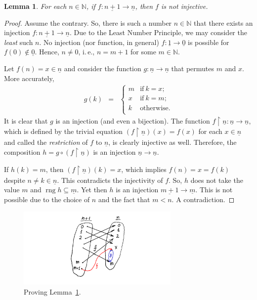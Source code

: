 \documentclass[12pt,notitlepage]{article}
\theoremstyle{plain}
\newtheorem{lemma}[thm]{Lemma}
\theoremstyle{definition}
\theoremstyle{plain}
\newcommand{\N}{\mathbb{N}}
\newcommand{\sbs}{\subseteq}
\newcommand{\rng}{\mathop{\mathrm{rng}}}
\newcommand{\rst}{\mathop{\upharpoonright}}
\newcommand{\ul}[1]{\underline{#1}}
\newcommand{\1}{\mathbf{1}}
\newcommand{\0}{\mathbf{0}}
\begin{document}
\begin{lemma}\label{L10:dirichlet_lemma}
For each $n \in \N$, if $f\colon \ul{n+1} \to \ul{n}$, then $f$ is \emph{not} injective.
\end{lemma}
\begin{proof}
Assume the contrary. So, there is such a number $n \in \N$ that there exists an injection $f\colon \ul{n+1} \to \ul{n}$. Due to the Least Number Principle, we may consider the \emph{least} such $n$. No injection (nor function, in general) $f\colon \ul{1} \to \ul{0}$ is possible for $f(0) \notin \ul{0}$. Hence, $n \neq 0$, i.\,e., $n = m + 1$ for some $m \in \N$.

Let $f(n) = x \in \ul{n}$ and consider the function $g\colon \ul{n} \to \ul{n}$ that permutes $m$ and $x$. More accurately,
$$
\begin{array}{rcll}
g(k) &=&\begin{cases}
			m&\mbox{if}\ k = x;\\
			x&\mbox{if}\ k = m;\\
			k& \mbox{otherwise}.\\
\end{cases}
\end{array}
$$
It is clear that $g$ is an injection (and even a bijection). The function $f\rst \ul{n}\colon \ul{n} \to \ul{n}$, which is defined by the trivial equation $(f\rst \ul{n})(x) = f(x)$ for each $x \in \ul{n}$ and called the \emph{restriction} of $f$ to $\ul{n}$, is clearly injective as well. Therefore, the composition $h = g \circ (f \rst \ul{n})$ is an injection $\ul{n} \to \ul{n}$.

If $h(k) = m$, then $(f \rst \ul{n})(k) = x$, which implies  $f(n) = x = f(k)$ despite $n \neq k \in \ul{n}$. This contradicts the injectivity of $f$. So, $h$ does not take the value $m$ and $\rng h \sbs \ul{m}$. Yet then $h$ is an injection $\ul{m+1} \to \ul{m}$. This is not possible due to the choice of $n$ and the fact that $m < n$. A contradiction.
\end{proof}

\begin{figure}[h]
\centering
\includegraphics*[width=0.7\textwidth]{dirichlet.pdf}
\caption{Proving Lemma~\ref{L10:dirichlet_lemma}.}
\end{figure}
\end{document}
